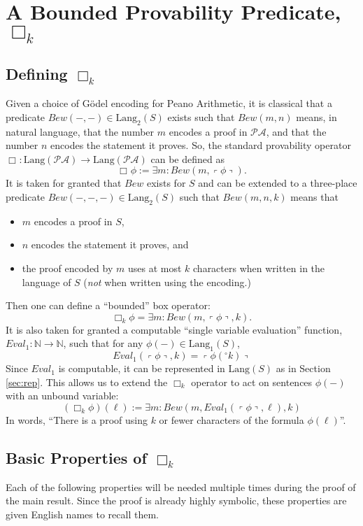 \documentclass[onecolumn]{miri-tech-article}
\numberwithin{equation}{section}
\theoremstyle{definition}
\newcommand{\NN}{\mathbb{N}}
\newcommand{\bx}[1]{\Box_{#1}}
\newcommand{\PA}{\mathcal{P}\!\mathcal{A}}
\newcommand{\Lang}{\mathrm{Lang}}
\renewcommand{\to}{\rightarrow}
\newcommand{\qquote}[1]{\left\ulcorner #1 \right\urcorner}
\newcommand{\numeral}{{}^\circ}
\renewcommand{\-}{^{-1}}
\begin{document}
\section{A Bounded Provability Predicate, \texorpdfstring{$\bx{k}$}{box k}} \label{sec:bpp}
\subsection{Defining \texorpdfstring{$\bx{k}$}{box k}}
Given a choice of G\"{o}del encoding for Peano Arithmetic, it is classical that a predicate $Bew(-,-) \in \Lang_2(S)$ exists such that $Bew(m,n)$ means, in natural language, that the number $m$ encodes a proof in $\PA$, and that the number $n$ encodes the statement it proves.  So, the standard provability operator $\bx{}:\Lang(\PA)\to\Lang(\PA)$ can be defined as
$$\bx{}\phi := \exists m : Bew(m,\qquote\phi).$$
It is taken for granted that $Bew$ exists for $S$ and can be extended to a three-place predicate $Bew(-,-,-) \in \Lang_2(S)$ such that $Bew(m,n,k)$ means that 

\begin{itemize}
\item $m$ encodes a proof in $S$,
\item $n$ encodes the statement it proves, and
\item the proof encoded by $m$ uses at most $k$ characters when written in the language of $S$ ({\em not} when written using the encoding.)
\end{itemize}
%
Then one can define a ``bounded'' box operator:
$$\bx{k}\phi = \exists m : Bew(m,\qquote{\phi},k).$$
It is also taken for granted a computable ``single variable evaluation'' function, $Eval_1:\NN\to\NN$, such that for any $\phi(-)\in\Lang_1(S)$, 
$$Eval_1(\qquote\phi,k) = \qquote{\phi(\numeral k)}$$
Since $Eval_1$ is computable, it can be represented in $\Lang(S)$ as in Section \ref{sec:rep}.  
This allows us to extend the $\bx{k}$ operator to act on sentences $\phi(-)$ with an unbound variable:
%
$$(\bx{k}\phi)(\ell) := \exists m : Bew(m,Eval_1(\qquote\phi,\ell),k)$$
%
In words, ``There is a proof using $k$ or fewer characters of the formula $\phi(\ell)$''.

\subsection{Basic Properties of \texorpdfstring{$\bx{k}$}{box k}}
Each of the following properties will be needed multiple times during the proof of the main result.  Since the proof is already highly symbolic, these properties are given English names to recall them. 
\end{document}
